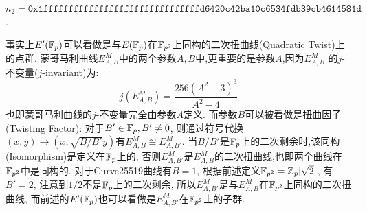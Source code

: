 \centerline{$n_2=\texttt{0x1fffffffffffffffffffffffffffffffd6420c42ba10c6534fdb39cb4614581d}$.}
事实上$E'(\mathbb{F}_p)$可以看做是与$E(\mathbb{F}_p)$在$\mathbb{F}_{p^2}$上同构的二次扭曲线(Quadratic Twist)上的点群.
蒙哥马利曲线$E_{A,B}^M$中的两个参数$A, B$中,更重要的是参数$A$,因为$E_{A,B}^M$
的$j$-不变量($j$-invariant)为:
$$j(E_{A,B}^M) = \frac{256(A^2-3)^3}{A^2-4}$$
也即蒙哥马利曲线的$j$-不变量完全由参数$A$定义.
而参数$B$可以被看做是扭曲因子(Twisting Factor): 对于$B' \in \mathbb{F}_p, B' \neq 0$,
则通过符号代换$(x,y)\rightarrow(x,\sqrt{B/B'}y)$有$E_{A,B}^M \cong E_{A,B'}^M$.
当$B/B'$是$\mathbb{F}_p$上的二次剩余时,该同构(Isomorphism)是定义在$\mathbb{F}_p$上的,
否则$E_{A,B'}^M$是$E_{A,B}^M$的二次扭曲线,也即两个曲线在$\mathbb{F}_{p^2}$中是同构的.
对于Curve25519曲线有$B=1$, 根据前述定义$\mathbb{F}_{p^2} = \mathbb{Z}_{p}[\sqrt{2}]$, 
有$B'=2$, 注意到$1/2$不是$\mathbb{F}_p$上的二次剩余,
所以$E_{A,B'}^M$是与$E_{A,B}^M$在$\mathbb{F}_{p^2}$上同构的二次扭曲线,
而前述的$E'(\mathbb{F}_p)$也可以看做是$E_{A,B'}^M$在$\mathbb{F}_{p^2}$上的子群.

